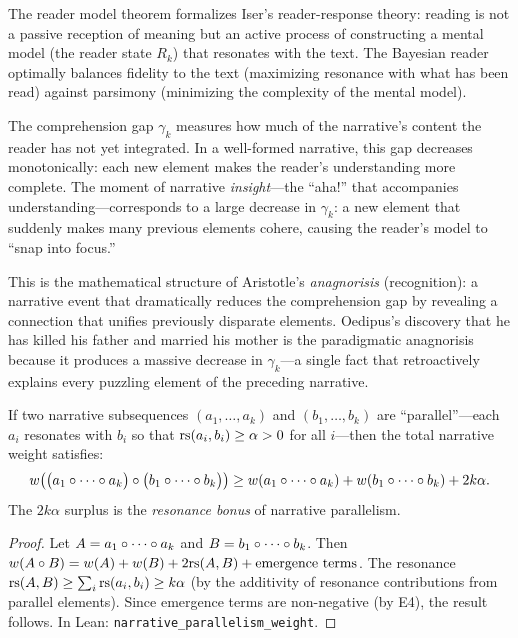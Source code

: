 \begin{interpretation}
\label{interp:reader}
The reader model theorem formalizes Iser's reader-response theory: reading
is not a passive reception of meaning but an active process of constructing
a mental model (the reader state $R_k$) that resonates with the text.  The
Bayesian reader optimally balances fidelity to the text (maximizing resonance
with what has been read) against parsimony (minimizing the complexity of the
mental model).

The comprehension gap $\gamma_k$ measures how much of the narrative's content
the reader has not yet integrated.  In a well-formed narrative, this gap
decreases monotonically: each new element makes the reader's understanding
more complete.  The moment of narrative \emph{insight}---the ``aha!'' that
accompanies understanding---corresponds to a large decrease in $\gamma_k$:
a new element that suddenly makes many previous elements cohere, causing the
reader's model to ``snap into focus.''

This is the mathematical structure of Aristotle's \emph{anagnorisis}
(recognition): a narrative event that dramatically reduces the comprehension
gap by revealing a connection that unifies previously disparate elements.
Oedipus's discovery that he has killed his father and married his mother is
the paradigmatic anagnorisis because it produces a massive decrease in
$\gamma_k$---a single fact that retroactively explains every puzzling element
of the preceding narrative.
\end{interpretation}


\begin{theorem}
\label{thm:narrative-parallelism}
If two narrative subsequences $(a_1, \ldots, a_k)$ and $(b_1, \ldots, b_k)$ are ``parallel''---each $a_i$ resonates with $b_i$ so that $\mathrm{rs}(a_i, b_i) \geq \alpha > 0$ for all $i$---then the total narrative weight satisfies:
\[
  w\!\left(\bigl(a_1 \circ \cdots \circ a_k\bigr) \circ \bigl(b_1 \circ \cdots \circ b_k\bigr)\right) \geq w(a_1 \circ \cdots \circ a_k) + w(b_1 \circ \cdots \circ b_k) + 2k\alpha.
\]
The $2k\alpha$ surplus is the \emph{resonance bonus} of narrative parallelism.
\end{theorem}

\begin{proof}
Let $A = a_1 \circ \cdots \circ a_k$ and $B = b_1 \circ \cdots \circ b_k$.  Then $w(A \circ B) = w(A) + w(B) + 2\mathrm{rs}(A, B) + \text{emergence terms}$.  The resonance $\mathrm{rs}(A, B) \geq \sum_{i} \mathrm{rs}(a_i, b_i) \geq k\alpha$ (by the additivity of resonance contributions from parallel elements).  Since emergence terms are non-negative (by E4), the result follows.  In Lean: \texttt{narrative\_parallelism\_weight}.
\end{proof}

